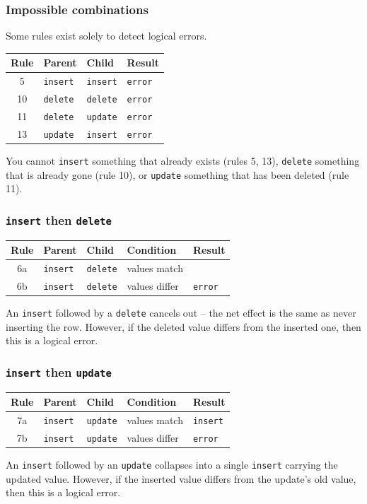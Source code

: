 \documentclass{beamer}
\begin{document}
\begin{frame}
\frametitle{Impossible combinations}
Some rules exist solely to detect logical errors.
\medskip
\begin{table}
\centering
\begin{tabular}{clll}
Rule & Parent & Child & Result \\
\hline
5  & \texttt{insert} & \texttt{insert} & \texttt{error} \\
10 & \texttt{delete} & \texttt{delete} & \texttt{error} \\
11 & \texttt{delete} & \texttt{update} & \texttt{error} \\
13 & \texttt{update} & \texttt{insert} & \texttt{error}
\end{tabular}
\end{table}
\begin{example}
You cannot \texttt{insert} something that already exists (rules 5, 13),
\texttt{delete} something that is already gone (rule 10), or \texttt{update}
something that has been deleted (rule 11).
\end{example}
\end{frame}

\begin{frame}
\frametitle{\texttt{insert} then \texttt{delete}}
\begin{table}
\centering
\begin{tabular}{cllll}
Rule & Parent & Child & Condition & Result \\
\hline
6a & \texttt{insert} & \texttt{delete} & values match  &                \\
6b & \texttt{insert} & \texttt{delete} & values differ & \texttt{error} \\
\end{tabular}
\end{table}
\begin{example}
An \texttt{insert} followed by a \texttt{delete} cancels out -- the net effect
is the same as never inserting the row. However, if the deleted value differs
from the inserted one, then this is a logical error.
\end{example}
\end{frame}

\begin{frame}
\frametitle{\texttt{insert} then \texttt{update}}
\begin{table}
\centering
\begin{tabular}{cllll}
Rule & Parent & Child & Condition & Result \\
\hline
7a & \texttt{insert} & \texttt{update} & values match  & \texttt{insert} \\
7b & \texttt{insert} & \texttt{update} & values differ & \texttt{error}  \\
\end{tabular}
\end{table}
\begin{example}
An \texttt{insert} followed by an \texttt{update} collapses into a single
\texttt{insert} carrying the updated value. However, if the inserted value differs
from the update's old value, then this is a logical error.
\end{example}
\end{frame}
\end{document}
